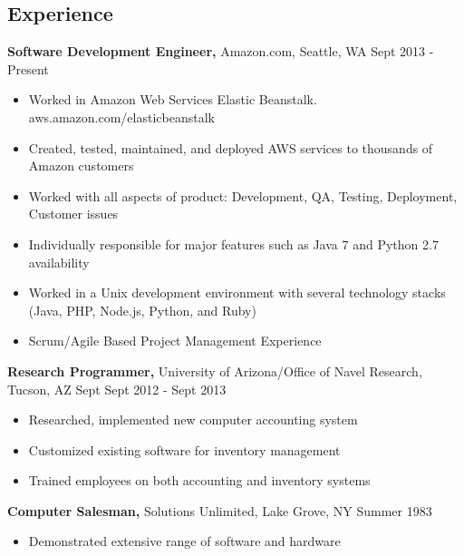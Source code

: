 \documentclass[line]{res}
\begin{document}
 
 
 
\address{2226 Elliott Ave Apt 113, Seattle, WA 98121 (928) 284-5522
Charliec364@gmail.com } 
 
\begin{resume} 
 
\section{Experience}
 {\bf Software Development Engineer,} Amazon.com, Seattle, WA \hfill Sept 2013 - Present
 \begin{itemize} \itemsep -2pt  %
 \item Worked in Amazon Web Services Elastic Beanstalk. aws.amazon.com/elasticbeanstalk
 \item Created, tested, maintained, and deployed AWS services to thousands of Amazon customers
 \item Worked with all aspects of product: Development, QA, Testing, Deployment, Customer issues
 \item Individually responsible for major features such as Java 7 and Python 2.7 availability
 \item Worked in a Unix development environment with several technology stacks (Java,  PHP, Node.js, Python, and Ruby)
 \item Scrum/Agile Based Project Management Experience
 \end{itemize}

 
 
{\bf Research Programmer,} University of Arizona/Office of Navel Research, Tucson, AZ \hfill  Sept Sept 2012 - Sept 2013
\begin{itemize} \itemsep -2pt %
\item Researched, implemented new computer accounting 
                 system 
\item Customized existing software for inventory 
                 management 
\item Trained employees on both accounting and inventory 
                 systems 
\end{itemize}

{\bf Computer Salesman,} Solutions Unlimited, Lake Grove, NY \hfill
Summer 1983                
                \begin{itemize} \itemsep -2pt
                 \item  Demonstrated extensive range of software and 
                 hardware 
                

\end{itemize}
\end{resume}
\end{document}
